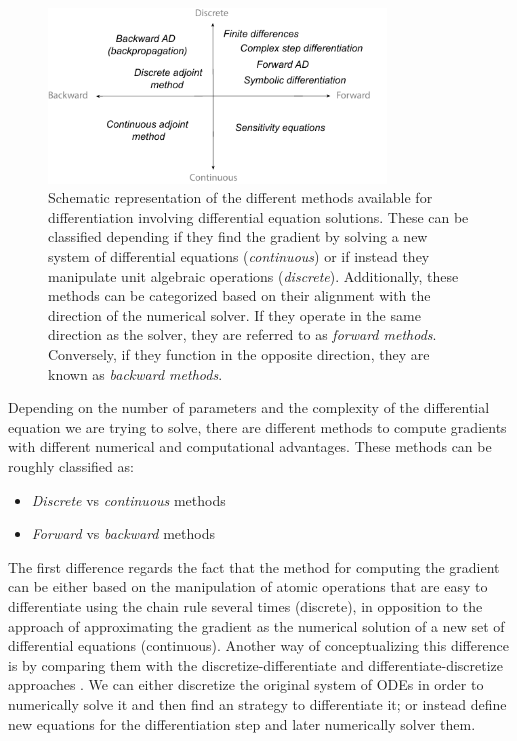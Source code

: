 \begin{figure}[t]
    \centering
    \includegraphics[width=0.80\textwidth]{figures/scheme-methods.pdf}
    \caption{Schematic representation of the different methods available for differentiation involving differential equation solutions. These can be classified depending if they find the gradient by solving a new system of differential equations (\textit{continuous}) or if instead they manipulate unit algebraic operations (\textit{discrete}). Additionally, these methods can be categorized based on their alignment with the direction of the numerical solver. If they operate in the same direction as the solver, they are referred to as \textit{forward methods}. Conversely, if they function in the opposite direction, they are known as \textit{backward methods}.}
    \label{fig:diff}
\end{figure}
Depending on the number of parameters and the complexity of the differential equation we are trying to solve, there are different methods to compute gradients with different numerical and computational advantages.
These methods can be roughly classified as:
\begin{itemize}
    \item \textit{Discrete} vs \textit{continuous} methods
    \item \textit{Forward} vs \textit{backward} methods
\end{itemize}
The first difference regards the fact that the method for computing the gradient can be either based on the manipulation of atomic operations that are easy to differentiate using the chain rule several times (discrete), in opposition to the approach of approximating the gradient as the numerical solution of a new set of differential equations (continuous).
Another way of conceptualizing this difference is by comparing them with the discretize-differentiate and differentiate-discretize approaches \cite{bradley2013pde, Onken_Ruthotto_2020, FATODE2014, Sirkes_Tziperman_1997}.   
We can either discretize the original system of ODEs in order to numerically solve it and then find an strategy to differentiate it; or instead define new equations for the differentiation step and later numerically solver them.

